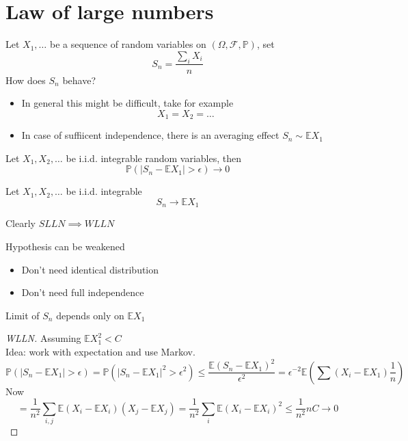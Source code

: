 \documentclass[../main.tex]{subfiles}
\begin{document}
\section{Law of large numbers}
Let $X_1,\ldots$ be a sequence of random variables on $( \Omega, \mathcal{F}, \mathbb{P}) $, set 
\[ 
S_n = \frac{\sum_i X_i}{ n}
\]
How does $S_n$ behave?\\
\begin{itemize}
\item In general this might be difficult, take for example
	\[ 
	X_1= X_2= \ldots
	\]

\item In case of suffiicent independence, there is an averaging effect $S_n \sim \mathbb{E}X_1$ 
\end{itemize}
\begin{thm}
	Let $X_1, X_2, \ldots$ 	be i.i.d. integrable random variables, then
	\[ 
	\mathbb{P}( |S_n- \mathbb{E}X_1| > \epsilon) \to 0
	\]
	
\end{thm}
\begin{thm}
	Let $X_1, X_2, \ldots$ be i.i.d. integrable 
	\[ 
	S_n  \to \mathbb{E}X_1
	\]
	
\end{thm}
Clearly $ SLLN \implies WLLN$ 
\begin{rmq}
Hypothesis can be weakened 
\begin{itemize}

\item Don't need identical distribution
\item Don't need full independence 
\end{itemize}
\end{rmq}
\begin{rmq}
Limit of $S_n$ depends only on $ \mathbb{E}X_1$ 
\end{rmq}
\begin{proof}[WLLN]
Assuming $ \mathbb{E}X_1^{2} <C$\\
Idea: work with expectation and use Markov.
\[ 
\mathbb{P}( |S_n- \mathbb{E}X_1| > \epsilon) =  \mathbb{P}( |S_n- \mathbb{E}X_1|^{2} > \epsilon^{2}) \leq \frac{\mathbb{E}( S_n- \mathbb{E}X_1)^{2} }{\epsilon^{2}} = \epsilon^{-2} \mathbb{E}(   \sum(  X_i- \mathbb{E}X_1) \frac{1}{n})
\]
Now
\[ 
= \frac{1}{n^{2}} \sum_{i,j} \mathbb{E}( X_i- \mathbb{E}X_i)( X_j- \mathbb{E}X_j) = \frac{1}{n^{2}} \sum_{i} \mathbb{E}( X_i- \mathbb{E}X_i)^{2} \leq \frac{1}{n^{2}} n C \to 0
\]

\end{proof}


	
	
\end{document}
